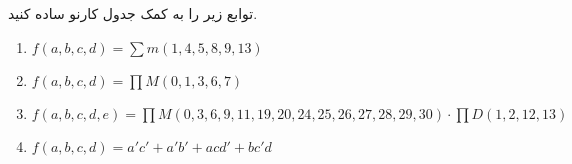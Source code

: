 توابع زیر را به کمک جدول کارنو ساده کنید.

\begin{latin}
	\begin{enumerate}
		\item %
		$f(a,b,c,d)=\sum m(1,4,5,8,9,13)$
		
		\item %
		$f(a,b,c,d)=\prod M(0,1,3,6,7)$
		
		\item %
		$f(a,b,c,d,e)=\prod M(0,3,6,9,11,19,20,24,25,26,27,28,29,30) \cdot \prod D(1,2,12,13)$
		
		\item %
		$f(a,b,c,d)=a'c' + a'b' + acd' + bc'd$
	\end{enumerate} 
\end{latin}